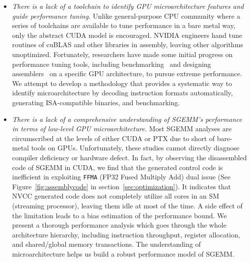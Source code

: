 \begin{itemize}
\item {\em There is a lack of a toolchain to identify GPU microarchitecture features and guide performance tuning.}
    Unlike general-purpose CPU community where a series of toolchains are available to tune performance in a bare metal
        way, only the abstract CUDA model is encouraged. NVIDIA engineers hand
        tune routines of cuBLAS and other libraries in assembly, leaving other algorithms unoptimized.
        Fortunately, researchers have made some initial progress on performance tuning tools, including benchmarking~\cite{mei, volkov, wong} and designing assemblers~\cite{asfermi,bernstein2012usable,decuda,maxas} on a 
specific GPU architecture, to pursue extreme performance. We attempt to develop a methodology that provides a systematic way to identify 
microarchitecture by decoding instruction formats automatically, generating ISA-compatible binaries, and benchmarking.
\item {\em There is a lack of a comprehensive understanding of SGEMM's performance in terms of low-level GPU 
microarchitecture.} Most SGEMM analyses are circumscribed at the levels of either CUDA or PTX due to short of 
bare-metal tools on GPUs. Unfortunately, these studies cannot directly diagnose compiler deficiency or hardware 
defect. In fact, by observing the disassembled code of SGEMM in CUDA, we find that the generated control code is  
inefficient in exploiting {\tt FFMA} (FP32 Fused Multiply Add) dual issue (See Figure~\ref{fig:assemblycode} in section~\ref{sec:optimization}). 
It indicates that NVCC generated code does not 
completely utilize all cores in an SM (streaming processor), leaving 
them idle at most of the time. 
A side effect of the limitation leads to a bias estimation of the performance bound. We 
present a thorough performance analysis which goes through the whole architecture hierarchy, including instruction 
throughput, register allocation, and shared/global memory transactions. The understanding of microarchitecture helps us 
build a robust performance model of SGEMM.
\end{itemize}

